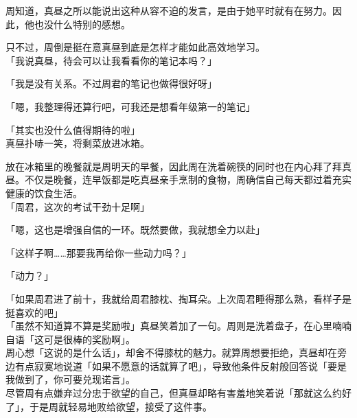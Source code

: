 周知道，真昼之所以能说出这种从容不迫的发言，是由于她平时就有在努力。因此，他也没什么特别的感想。

只不过，周倒是挺在意真昼到底是怎样才能如此高效地学习。\\

「我说真昼，待会可以让我看看你的笔记本吗？」

「我是没有关系。不过周君的笔记也做得很好呀」

「嗯，我整理得还算行吧，可我还是想看年级第一的笔记」

「其实也没什么值得期待的啦」\\

真昼扑哧一笑，将剩菜放进冰箱。

放在冰箱里的晚餐就是周明天的早餐，因此周在洗着碗筷的同时也在内心拜了拜真昼。不仅是晚餐，连早饭都是吃真昼亲手烹制的食物，周确信自己每天都过着充实健康的饮食生活。\\

「周君，这次的考试干劲十足啊」

「嗯，这也是增强自信的一环。既然要做，我就想全力以赴」

「这样子啊……那要我再给你一些动力吗？」

「动力？」

「如果周君进了前十，我就给周君膝枕、掏耳朵。上次周君睡得那么熟，看样子是挺喜欢的吧」\\

「虽然不知道算不算是奖励啦」真昼笑着加了一句。周则是洗着盘子，在心里喃喃自语「这可是很棒的奖励啊」。\\

周心想「这说的是什么话」，却舍不得膝枕的魅力。就算周想要拒绝，真昼却在旁边有点寂寞地说道「如果不愿意的话就算了吧」，导致他条件反射般回答说「要是我做到了，你可要兑现诺言」。\\

尽管周有点嫌弃过分忠于欲望的自己，但真昼却略有害羞地笑着说「那就这么约好了」，于是周就轻易地败给欲望，接受了这件事。
